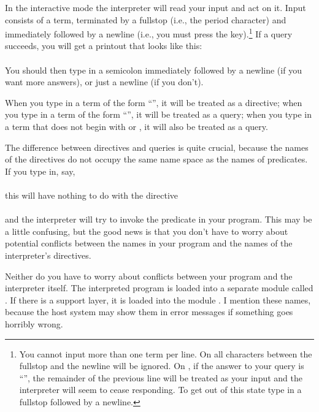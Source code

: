 In the interactive mode the interpreter will read your input and act on it.
Input consists of a term, terminated by a fullstop (i.e., the period
character) and immediately followed by a newline (i.e., you must press the
 key).\footnote{
  You cannot input more than one term per line. On \Sicstus{} all characters
  between the fullstop and the newline will be ignored.  On \Eclipse{}, if the
  answer to your query is ``'', the remainder of the
  previous line will be treated as your input and the interpreter will seem
  to cease responding.  To get out of this state type in a fullstop followed
  by a newline.}
If a query succeeds, you will get a printout that looks like this:\\
\ind{}\\
You should then type in a semicolon immediately followed by a newline (if you
want more answers), or just a newline (if you don't).

When you type in a term of the form ``'', it will be
treated as a directive; when you type in a term of the form
``'', it will be treated as a query; when
you type in a term that does not begin with \prog{:-} or , it will
also be treated as a query.

The difference between directives and queries is quite crucial, because the
names of the directives do not occupy the same name space
as the names of predicates.  If you type in, say,\\
\ind{}\\
this will have nothing to do with the directive\\
\ind{}\\
and the interpreter will try to invoke the predicate  in your
program.  This may be a little confusing, but the good news is that you don't
have to worry about potential conflicts between the names in your program and
the names of the interpreter's directives.

Neither do you have to worry about conflicts between your program and the
interpreter itself. The interpreted program is loaded into a separate module
called .  If there is a support layer, it is loaded into
the module .  I mention these names, because the host system
may show them in error messages if something goes horribly wrong.


%

